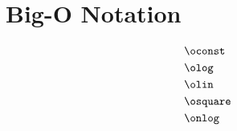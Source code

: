 \documentclass{scrartcl}
\begin{document}
\section*{Big-O Notation}

\begin{align*}
    &\oconst \\
    &\olog \\
    &\olin \\
    &\osquare \\
    &\onlog
\end{align*}
\end{document}
